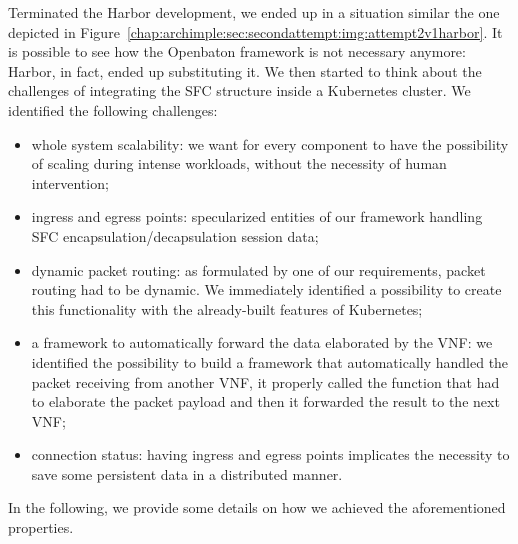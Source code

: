 Terminated the Harbor development, we ended up in a situation similar the one
depicted in Figure~\ref{chap:archimple:sec:secondattempt:img:attempt2v1harbor}.
It is possible to see how the Openbaton framework is not necessary anymore:
Harbor, in fact, ended up substituting it. We then started to think about the
challenges of integrating the SFC structure inside a Kubernetes cluster. We
identified the following challenges:
\begin{itemize}
\item whole system scalability: we want for every component to have the
  possibility of scaling during intense workloads, without the necessity of
  human intervention;
\item ingress and egress points: specularized entities of our framework handling
  SFC encapsulation/decapsulation session data;
\item dynamic packet routing: as formulated by one of our requirements, packet
  routing had to be dynamic. We immediately identified a possibility to create
  this functionality with the already-built features of Kubernetes;
\item a framework to automatically forward the data elaborated by the VNF: we
  identified the possibility to build a framework that automatically handled the
  packet receiving from another VNF, it properly called the function that had to
  elaborate the packet payload and then it forwarded the result to the next VNF;
\item connection status: having ingress and egress points implicates the
  necessity to save some persistent data in a distributed manner.
\end{itemize}
In the following, we provide some details on how we achieved the aforementioned
properties.

